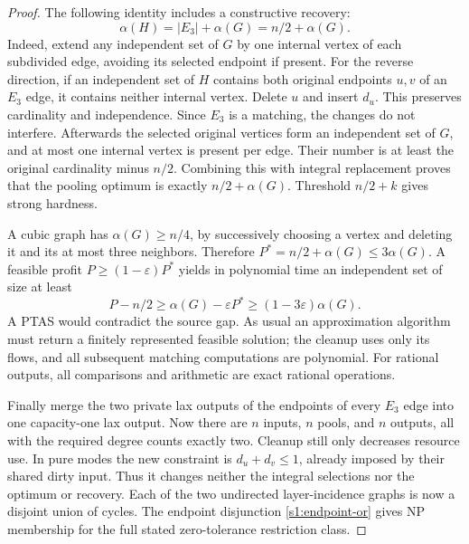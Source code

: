\begin{proof}
The following identity includes a constructive recovery:
\begin{equation}
 \alpha(H)=|E_3|+\alpha(G)=n/2+\alpha(G).\label{s3:is-identity}
\end{equation}
Indeed, extend any independent set of $G$ by one internal vertex of
each subdivided edge, avoiding its selected endpoint if present. For
the reverse direction, if an independent set of $H$ contains both
original endpoints $u,v$ of an $E_3$ edge, it contains neither internal
vertex. Delete $u$ and insert $d_u$. This preserves cardinality and
independence. Since $E_3$ is a matching, the changes do not interfere.
Afterwards the selected original vertices form an independent set of
$G$, and at most one internal vertex is present per edge. Their number
is at least the original cardinality minus $n/2$. Combining this with
integral replacement proves that the pooling optimum is exactly
$n/2+\alpha(G)$. Threshold $n/2+k$ gives strong hardness.

A cubic graph has $\alpha(G)\ge n/4$, by successively choosing a vertex
and deleting it and its at most three neighbors. Therefore
$P^*=n/2+\alpha(G)\le3\alpha(G)$. A feasible profit
$P\ge(1-\varepsilon)P^*$ yields in polynomial time an independent set
of size at least
\begin{equation}
 P-n/2\ge\alpha(G)-\varepsilon P^*
 \ge(1-3\varepsilon)\alpha(G).\label{s3:gap-transfer}
\end{equation}
A PTAS would contradict the source gap. As usual an approximation
algorithm must return a finitely represented feasible solution; the
cleanup uses only its flows, and all subsequent matching computations
are polynomial. For rational outputs, all comparisons and arithmetic
are exact rational operations.

Finally merge the two private lax outputs of the endpoints of every
$E_3$ edge into one capacity-one lax output. Now there are $n$ inputs,
$n$ pools, and $n$ outputs, all with the required degree counts exactly
two. Cleanup still only decreases resource use. In pure modes the new
constraint is $d_u+d_v\le1$, already imposed by their shared dirty input.
Thus it changes neither the integral selections nor the optimum or
recovery. Each of the two undirected layer-incidence graphs is now a
disjoint union of cycles. The endpoint disjunction
\eqref{s1:endpoint-or} gives NP membership for the full stated
zero-tolerance restriction class.
\end{proof}


